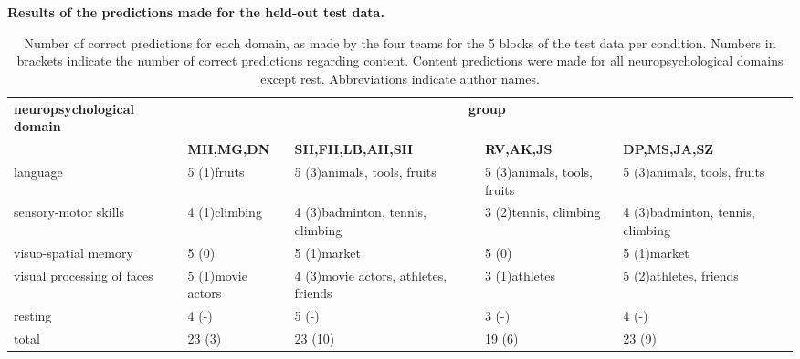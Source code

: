 \documentclass[fleqn,10pt]{SelfArx} %
\begin{document}
		
		\begin{table}[htbp]
			\scriptsize
			\centering
			\captionsetup{singlelinecheck = false, justification=justified}
			\caption{\bf Results of the predictions made for the held-out test data.}
			\begin{tabularx}{\textwidth}{XXXXX}
				\hline
				{\bf neuropsychological domain} & \multicolumn{4}{c}{{\bf group}} \\
				 & {\bf MH,MG,DN} &		 {\bf SH,FH,LB,AH,SH} &	 {\bf RV,AK,JS} &		 {\bf DP,MS,JA,SZ} \\
				\hline
			
				language                  & 5 (1)\newline  fruits  & 5 (3)\newline animals, tools, fruits              & 5 (3)\newline animals, tools, fruits                &    5 (3)\newline  animals, tools, fruits  \\
				
				sensory-motor skills   &	4 (1)\newline climbing & 4 (3)\newline badminton, tennis, climbing  & 3 (2)\newline tennis, climbing  & 4 (3)\newline badminton, tennis, climbing \\
				
				visuo-spatial memory   & 	5 (0)\newline          &	5 (1)\newline market	&        5 (0)\newline   	& 5 (1)\newline  market  \\	
				
				visual processing of faces	& 5 (1)\newline movie actors & 4 (3)\newline  movie actors, athletes, friends & 3 (1)\newline  athletes 	& 5 (2)\newline athletes, friends \\
				
				resting                   &	4 (-)\newline &	5 (-)\newline &	3 (-)\newline & 	4 (-)\newline \\
				total &	23 (3) &	23 (10) &	19 (6) &	23 (9) \\
				
				\hline
			\end{tabularx}
			\caption*{Number of correct predictions for each domain, as made by the four teams for the 5 blocks of the test data per condition. Numbers in brackets indicate the number of correct predictions regarding content. Content predictions were made for all neuropsychological domains except rest. Abbreviations indicate author names. }
			\label{tab:testTab}
		\end{table}
		
\end{document}
